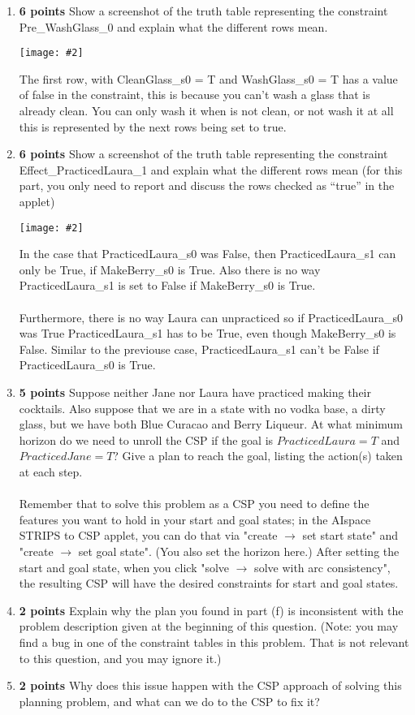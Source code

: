 \documentclass{article}
\def\ans#1{{\color{ans}#1}}
\newcommand{\centerfig}[2]{\begin{center}\texttt{[image: \#2]}\end{center}}
\begin{document}
\begin{enumerate}[label=(\alph*)]
    \centerfig{1}{../figs/q2_1.png}
    \item \textbf{6 points} Show a screenshot of the truth table representing the constraint Pre\_WashGlass\_0 and explain what the different rows mean. \\
    \centerfig{0.6}{../figs/q2_2.png}
    \ans{
        The first row, with CleanGlass\_s0 = T and WashGlass\_s0 = T has a value of false in the 
        constraint, this is because you can't wash a glass that is already clean. You can only wash it 
        when is not clean, or not wash it at all this is represented by the next rows being set to true.
    }
    \item \textbf{6 points} Show a screenshot of the truth table representing the constraint Effect\_PracticedLaura\_1 and explain what the different rows mean (for this part, you only need to report and discuss the rows checked as “true” in the applet)\\
    \centerfig{0.6}{../figs/q2_3.png}
    \ans{
        In the case that PracticedLaura\_s0 was False, then PracticedLaura\_s1 can only be True, if MakeBerry\_s0 
        is True. Also there is no way PracticedLaura\_s1 is set to False if MakeBerry\_s0 is True. \\ \\
        Furthermore, there is no way Laura can unpracticed so if PracticedLaura\_s0 
        was True PracticedLaura\_s1 has to be True, even though MakeBerry\_s0 is False. Similar to the 
        previouse case, PracticedLaura\_s1 can't be False if PracticedLaura\_s0 is True.
    }
    \item \textbf{5 points} Suppose neither Jane nor Laura have practiced making their cocktails. Also suppose that we are in a state with no vodka base, a dirty glass, but we have both Blue Curacao and Berry Liqueur. At what minimum horizon do we need to unroll the CSP if the goal is $PracticedLaura = T$ and $PracticedJane = T$? Give a plan to reach the goal, listing the action(s) taken at each step. \\ \\ Remember that to solve this problem as a CSP you need to define the features you want to hold in your start and goal states; in the AIspace STRIPS to CSP applet, you can do that via "create $\rightarrow$ set start state" and "create $\rightarrow$ set goal state". (You also set the horizon here.) After setting the start and goal state, when you click "solve $\rightarrow$ solve with arc consistency", the resulting CSP will have the desired constraints for start and goal states.\\
    \item \textbf{2 points} Explain why the plan you found in part (f) is inconsistent with the problem description given at the beginning of this question. (Note: you may find a bug in one of the constraint tables in this problem. That is not relevant to this question, and you may ignore it.)\\
    \item \textbf{2 points} Why does this issue happen with the CSP approach of solving this planning problem, and what can we do to the CSP to fix it?\\
\end{enumerate}
\end{document}
